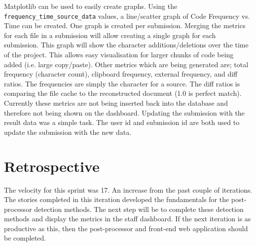 Matplotlib can be used to easily create graphs. Using the \texttt{frequency\_time\_source\_data} values, a line/scatter graph of Code Frequency vs. Time can be created. One graph is created per submission. Merging the metrics for each file in a submission will allow creating a single graph for each submission. This graph will show the character additions/deletions over the time of the project. This allows easy visualisation for larger chunks of code being added (i.e. large copy/paste). Other metrics which are being generated are; total frequency (character count), clipboard frequency, external frequency, and diff ratios. The frequencies are simply the character for a source. The diff ratios is comparing the file cache to the reconstructed document (1.0 is perfect match). Currently these metrics are not being inserted back into the database and therefore not being shown on the dashboard. Updating the submission with the result data was a simple task. The user id and submission id are both used to update the submission with the new data.

\section{Retrospective}
The velocity for this sprint was 17. An increase from the past couple of iterations. The stories completed in this iteration developed the fundamentals for the post-processor detection methods. The next step will be to complete these detection methods and display the metrics in the staff dashboard. If the next iteration is as productive as this, then the post-processor and front-end web application should be completed.

